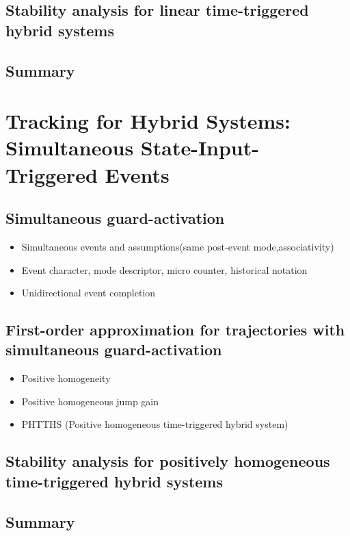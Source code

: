 \documentclass[../DC2017114Bouma.tex]{subfiles}
\begin{document}
\section{Stability analysis for linear time-triggered hybrid systems}

\section{Summary}


\cleartooddpage
\chapter{Tracking for Hybrid Systems: Simultaneous State-Input-Triggered Events}\label{ch:simult}
\cite{Rijnen2018}
\section{Simultaneous guard-activation}
\begin{itemize}
\item Simultaneous events and assumptions(same post-event mode,associativity)
\item Event character, mode descriptor, micro counter, historical notation
\item Unidirectional event completion
\end{itemize}
\section{First-order approximation for trajectories with simultaneous guard-activation}
\begin{itemize}
\item Positive homogeneity
\item Positive homogeneous jump gain
\item PHTTHS (Positive homogeneous time-triggered hybrid system)
\end{itemize}

\section{Stability analysis for positively homogeneous time-triggered hybrid systems}

\section{Summary}
\end{document}
